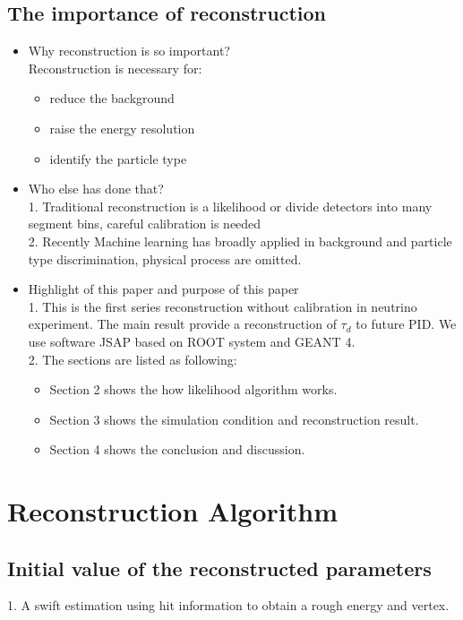 \documentclass{article}
\begin{document}
\subsection{The importance of reconstruction}
\begin{itemize}
\item {Why reconstruction is so important?} \\
Reconstruction is necessary for:
     \begin{itemize}
	\item reduce the background
	\item raise the energy resolution
     \item identify the particle type
     \end{itemize}
\item {Who else has done that?} \\
1. Traditional reconstruction is a likelihood or divide detectors into many segment bins, careful calibration is needed \\
2. Recently Machine learning has broadly applied in background and particle type discrimination, physical process are omitted.\\
\item{Highlight of this paper and purpose of this paper} \\
1. This is the first series reconstruction without calibration in neutrino experiment. The main result provide a reconstruction of $\tau_d$ to future PID. We use software JSAP based on ROOT system and GEANT 4.\\
2. The sections are listed as following:
     \begin{itemize}
	\item Section 2 shows the how likelihood algorithm works. 
	\item Section 3 shows the simulation condition and reconstruction result. 
     \item Section 4 shows the conclusion and discussion.
     \end{itemize}
\end{itemize}

\section{Reconstruction Algorithm}
\subsection{Initial value of the reconstructed parameters}
1. A swift estimation using hit information to obtain a rough energy and vertex. 
\end{document}
